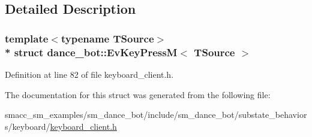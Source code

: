 \subsection{Detailed Description}
\subsubsection*{template$<$typename T\+Source$>$\\*
struct dance\+\_\+bot\+::\+Ev\+Key\+Press\+M$<$ T\+Source $>$}



Definition at line 82 of file keyboard\+\_\+client.\+h.



The documentation for this struct was generated from the following file\+:\begin{DoxyCompactItemize}
\item 
smacc\+\_\+sm\+\_\+examples/sm\+\_\+dance\+\_\+bot/include/sm\+\_\+dance\+\_\+bot/substate\+\_\+behaviors/keyboard/\hyperlink{keyboard__client_8h}{keyboard\+\_\+client.\+h}\end{DoxyCompactItemize}
